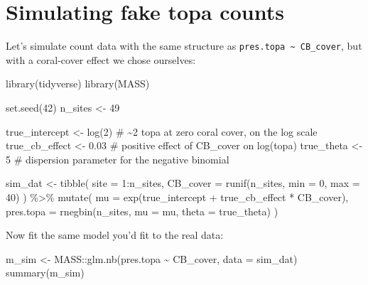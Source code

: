 \documentclass[
  letterpaper,
  DIV=11,
  numbers=noendperiod]{scrreprt}
\newenvironment{Shaded}{\begin{snugshade}}{\end{snugshade}}
\newcommand{\AttributeTok}[1]{\textcolor[rgb]{0.40,0.45,0.13}{#1}}
\newcommand{\CommentTok}[1]{\textcolor[rgb]{0.37,0.37,0.37}{#1}}
\newcommand{\DecValTok}[1]{\textcolor[rgb]{0.68,0.00,0.00}{#1}}
\newcommand{\FloatTok}[1]{\textcolor[rgb]{0.68,0.00,0.00}{#1}}
\newcommand{\FunctionTok}[1]{\textcolor[rgb]{0.28,0.35,0.67}{#1}}
\newcommand{\NormalTok}[1]{\textcolor[rgb]{0.00,0.23,0.31}{#1}}
\newcommand{\OtherTok}[1]{\textcolor[rgb]{0.00,0.23,0.31}{#1}}
\newcommand{\SpecialCharTok}[1]{\textcolor[rgb]{0.37,0.37,0.37}{#1}}
\begin{document}
\section{Simulating fake topa counts}\label{simulating-fake-topa-counts}

Let's simulate count data with the same structure as
\texttt{pres.topa\ \textasciitilde{}\ CB\_cover}, but with a coral-cover
effect we chose ourselves:

\begin{Shaded}
\begin{Highlighting}[]
\FunctionTok{library}\NormalTok{(tidyverse)}
\FunctionTok{library}\NormalTok{(MASS)}

\FunctionTok{set.seed}\NormalTok{(}\DecValTok{42}\NormalTok{)}
\NormalTok{n\_sites }\OtherTok{\textless{}{-}} \DecValTok{49}

\NormalTok{true\_intercept }\OtherTok{\textless{}{-}} \FunctionTok{log}\NormalTok{(}\DecValTok{2}\NormalTok{)     }\CommentTok{\# \textasciitilde{}2 topa at zero coral cover, on the log scale}
\NormalTok{true\_cb\_effect }\OtherTok{\textless{}{-}} \FloatTok{0.03}       \CommentTok{\# positive effect of CB\_cover on log(topa)}
\NormalTok{true\_theta }\OtherTok{\textless{}{-}} \DecValTok{5}              \CommentTok{\# dispersion parameter for the negative binomial}

\NormalTok{sim\_dat }\OtherTok{\textless{}{-}} \FunctionTok{tibble}\NormalTok{(}
  \AttributeTok{site =} \DecValTok{1}\SpecialCharTok{:}\NormalTok{n\_sites,}
  \AttributeTok{CB\_cover =} \FunctionTok{runif}\NormalTok{(n\_sites, }\AttributeTok{min =} \DecValTok{0}\NormalTok{, }\AttributeTok{max =} \DecValTok{40}\NormalTok{)}
\NormalTok{) }\SpecialCharTok{\%\textgreater{}\%}
  \FunctionTok{mutate}\NormalTok{(}
    \AttributeTok{mu =} \FunctionTok{exp}\NormalTok{(true\_intercept }\SpecialCharTok{+}\NormalTok{ true\_cb\_effect }\SpecialCharTok{*}\NormalTok{ CB\_cover),}
    \AttributeTok{pres.topa =} \FunctionTok{rnegbin}\NormalTok{(n\_sites, }\AttributeTok{mu =}\NormalTok{ mu, }\AttributeTok{theta =}\NormalTok{ true\_theta)}
\NormalTok{  )}
\end{Highlighting}
\end{Shaded}

Now fit the same model you'd fit to the real data:

\begin{Shaded}
\begin{Highlighting}[]
\NormalTok{m\_sim }\OtherTok{\textless{}{-}}\NormalTok{ MASS}\SpecialCharTok{::}\FunctionTok{glm.nb}\NormalTok{(pres.topa }\SpecialCharTok{\textasciitilde{}}\NormalTok{ CB\_cover, }\AttributeTok{data =}\NormalTok{ sim\_dat)}
\FunctionTok{summary}\NormalTok{(m\_sim)}
\end{Highlighting}
\end{Shaded}
\end{document}
